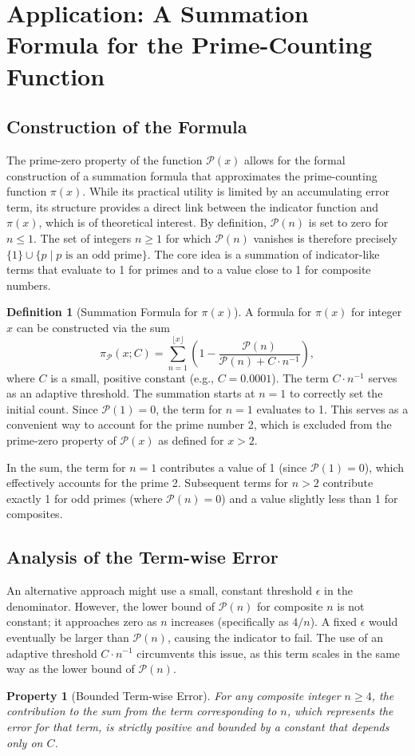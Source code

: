 \documentclass[11pt,a4paper]{amsart}
\newcommand{\Px}{\mathcal{P}}
\theoremstyle{plain}
\newtheorem{property}[theorem]{Property}
\theoremstyle{definition}
\newtheorem{definition}[theorem]{Definition}
\begin{document}
\section{Application: A Summation Formula for the Prime-Counting Function}

\subsection{Construction of the Formula}
The prime-zero property of the function $\Px(x)$ allows for the formal construction of a summation formula that approximates the prime-counting function $\pi(x)$. While its practical utility is limited by an accumulating error term, its structure provides a direct link between the indicator function and $\pi(x)$, which is of theoretical interest.
By definition, $\Px(n)$ is set to zero for $n \le 1$.
The set of integers $n \ge 1$ for which $\Px(n)$ vanishes is therefore precisely $\{1\} \cup \{p \mid p \text{ is an odd prime}\}$.
The core idea is a summation of indicator-like terms that evaluate to 1 for primes and to a value close to 1 for composite numbers.
\begin{definition}[Summation Formula for $\pi(x)$]\label{def:pi_formula}
A formula for $\pi(x)$ for integer $x$ can be constructed via the sum
\begin{equation}\label{eq:pi_P_adaptive}
\pi_\Px(x; C) = \sum_{n=1}^{\lfloor x \rfloor} \left(1 - \frac{\Px(n)}{\Px(n) + C \cdot n^{-1}}\right),
\end{equation}
where $C$ is a small, positive constant (e.g., $C=0.0001$).
The term $C \cdot n^{-1}$ serves as an adaptive threshold.
The summation starts at $n=1$ to correctly set the initial count. Since $\Px(1)=0$, the term for $n=1$ evaluates to 1. This serves as a convenient way to account for the prime number 2, which is excluded from the prime-zero property of $\Px(x)$ as defined for $x>2$.
\end{definition}

In the sum, the term for $n=1$ contributes a value of 1 (since $\Px(1)=0$), which effectively accounts for the prime 2. Subsequent terms for $n>2$ contribute exactly 1 for odd primes (where $\Px(n)=0$) and a value slightly less than 1 for composites.
\subsection{Analysis of the Term-wise Error}
An alternative approach might use a small, constant threshold $\epsilon$ in the denominator.
However, the lower bound of $\Px(n)$ for composite $n$ is not constant;
it approaches zero as $n$ increases (specifically as $4/n$). A fixed $\epsilon$ would eventually be larger than $\Px(n)$, causing the indicator to fail.
The use of an adaptive threshold $C \cdot n^{-1}$ circumvents this issue, as this term scales in the same way as the lower bound of $\Px(n)$.
\begin{property}[Bounded Term-wise Error]
For any composite integer $n \ge 4$, the contribution to the sum from the term corresponding to $n$, which represents the error for that term, is strictly positive and bounded by a constant that depends only on $C$.
\end{property}
\end{document}
